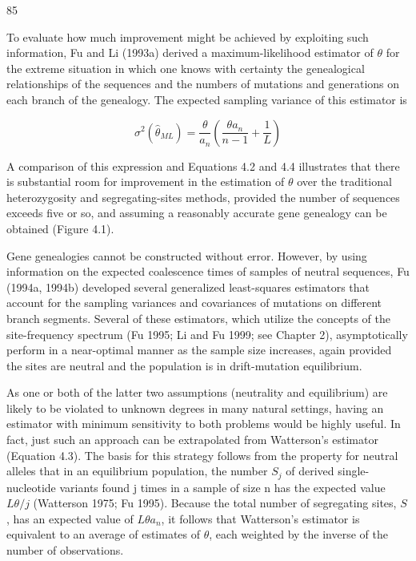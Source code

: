 \documentclass{article}
\begin{document}
85

To evaluate how much improvement might be achieved by exploiting such information, Fu and Li (1993a) derived a maximum-likelihood estimator of  $ \theta $ for the extreme situation in which one knows with certainty the genealogical relationships of the sequences and the numbers of mutations and generations on each branch of the genealogy. The expected sampling variance of this estimator is

\begin{equation}
\sigma^{2}(\widehat{\theta}_{ML})=\frac{\theta}{a_{n}}\left(\frac{\theta a_{n}}{n-1}+\frac{1}{L}\right)
\tag{4.5}
\label{eq:4_5}
\end{equation}

A comparison of this expression and Equations 4.2 and 4.4 illustrates that there is substantial room for improvement in the estimation of  $ \theta $ over the traditional heterozygosity and segregating-sites methods, provided the number of sequences exceeds five or so, and assuming a reasonably accurate gene genealogy can be obtained (Figure 4.1).

Gene genealogies cannot be constructed without error. However, by using information on the expected coalescence times of samples of neutral sequences, Fu (1994a, 1994b) developed several generalized least-squares estimators that account for the sampling variances and covariances of mutations on different branch segments. Several of these estimators, which utilize the concepts of the site-frequency spectrum (Fu 1995; Li and Fu 1999; see Chapter 2), asymptotically perform in a near-optimal manner as the sample size increases, again provided the sites are neutral and the population is in drift-mutation equilibrium.

As one or both of the latter two assumptions (neutrality and equilibrium) are likely to be violated to unknown degrees in many natural settings, having an estimator with minimum sensitivity to both problems would be highly useful. In fact, just such an approach can be extrapolated from Watterson's estimator (Equation 4.3). The basis for this strategy follows from the property for neutral alleles that in an equilibrium population, the number  $ S_j $ of derived single-nucleotide variants found j times in a sample of size n has the expected value  $ L\theta/j $ (Watterson 1975; Fu 1995). Because the total number of segregating sites,  $ S $, has an expected value of  $ L\theta a_n $, it follows that Watterson's estimator is equivalent to an average of estimates of  $ \theta $, each weighted by the inverse of the number of observations.
\end{document}
